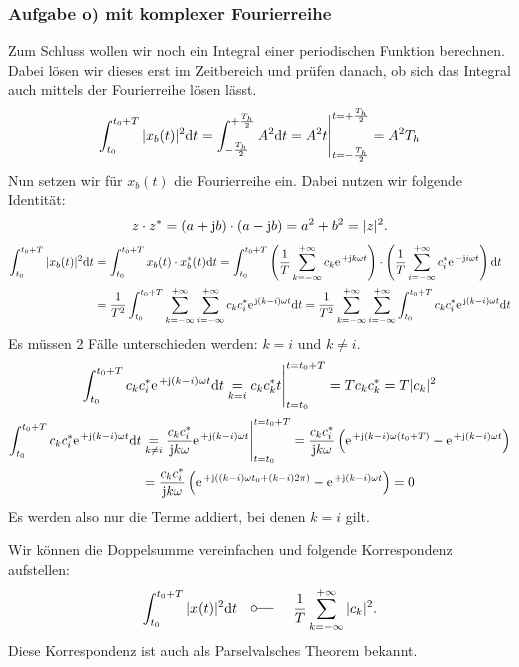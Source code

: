 \documentclass[11pt,a4paper,DIV=12]{scrartcl}
\begin{document}
\subsubsection{Aufgabe o) mit komplexer Fourierreihe}
%
Zum Schluss wollen wir noch ein Integral einer periodischen Funktion berechnen.
%
Dabei lösen wir dieses erst im Zeitbereich und prüfen danach, ob sich das
Integral auch mittels der Fourierreihe lösen lässt.
%
\begin{align}
	\int_{t_0}^{t_0+T}|x_b(t)|^2\mathrm{d} t
	=\int_{-\frac{T_h}{2}}^{+\frac{T_h}{2}}A^2\mathrm{d} t
	= A^2t\Bigg |_{t=-\frac{T_h}{2}}^{t=+\frac{T_h}{2}}=A^2T_h
\end{align}
%
Nun setzen wir für $x_b(t)$ die Fourierreihe ein.
%
Dabei nutzen wir folgende Identität:
%
\begin{align}
	z\cdot z^*=(a+\im b)\cdot (a-\im b)=a^2+b^2=|z|^2.
\end{align}
%
%
\begin{align}
	\int_{t_0}^{t_0+T}|x_b(t)|^2\diff t
	&=\int_{t_0}^{t_0+T}x_b(t)\cdot x_b^*(t)\diff t
	=\int_{t_0}^{t_0+T}\left (\frac{1}{T}\sum_{k=-\infty}^{+\infty}c_k\e^{+\im k \omega t}\right )\cdot \left (\frac{1}{T}\sum_{i=-\infty}^{+\infty}c_i^*\e^{-\im i \omega t}\right )\diff t\nonumber \\
	&=\frac{1}{T^2}\int_{t_0}^{t_0+T}\sum_{k=-\infty}^{+\infty}\sum_{i=-\infty}^{+\infty}c_kc_i^*\e^{\im (k-i)\omega t}\diff t =\frac{1}{T^2}\sum_{k=-\infty}^{+\infty}\sum_{i=-\infty}^{+\infty}\int_{t_0}^{t_0+T}c_kc_i^*\e^{\im (k-i)\omega t}\diff t
\end{align}
%
Es müssen 2 Fälle unterschieden werden: $k=i$ und $k\neq i$.
%
\begin{align}
	\int_{t_0}^{t_0+T}c_kc_i^*\e^{+\im (k-i)\omega t}\diff t \underset{k=i}{=}c_kc_k^*t\Bigg |_{t=t_0}^{t=t_0+T}=Tc_kc_k^*=T|c_k|^2
\end{align}
%
\begin{align}
	\int_{t_0}^{t_0+T}c_kc_i^*\e^{+\im (k-i)\omega t}\diff t
	&\underset{k\neq i}{=}\frac{c_kc_i^*}{\im k \omega }\e^{+\im (k-i)\omega t}\Bigg |_{t=t_0}^{t=t_0+T}
	=\frac{c_kc_i^*}{\im k \omega }\left (\e^{+\im (k-i)\omega (t_0+T)}-\e^{+\im (k-i)\omega t}\right )\nonumber \\
	&=\frac{c_kc_i^*}{\im k \omega }\left (\e^{+\im ((k-i)\omega t_0+(k-i)2\pi)}-\e^{+\im (k-i)\omega t}\right )=0
\end{align}
Es werden also nur die Terme addiert, bei denen $k=i$ gilt.
%

Wir können die Doppelsumme vereinfachen und folgende Korrespondenz aufstellen:
%
\begin{align}
	\int_{t_0}^{t_0+T}|x(t)|^2\diff t
	\quad\fourier\quad\frac{1}{T}\sum_{k=-\infty}^{+\infty}|c_k|^2.
\end{align}
Diese Korrespondenz ist auch als Parselvalsches Theorem bekannt.




\clearpage

\end{document}
